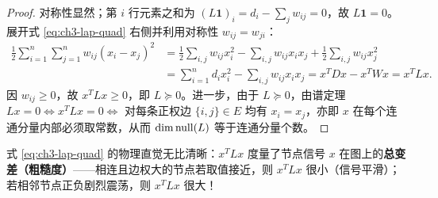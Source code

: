 \begin{proof}
对称性显然；第 $i$ 行元素之和为 $(L\mathbf{1})_i = d_i - \sum_j w_{ij} = 0$，故 $L\mathbf{1}=0$。展开式 \eqref{eq:ch3-lap-quad} 右侧并利用对称性 $w_{ij} = w_{ji}$：
\begin{align*}
  \frac{1}{2}\sum_{i=1}^n \sum_{j=1}^n w_{ij}(x_i - x_j)^2
  &= \frac{1}{2}\sum_{i,j} w_{ij} x_i^2 - \sum_{i,j} w_{ij} x_i x_j + \frac{1}{2}\sum_{i,j} w_{ij} x_j^2 \\
  &= \sum_{i=1}^n d_i x_i^2 - \sum_{i,j} w_{ij} x_i x_j
   = x^T D x - x^T W x = x^T L x.
\end{align*}
因 $w_{ij} \ge 0$，故 $x^T L x \ge 0$，即 $L \succeq 0$。进一步，由于 $L \succeq 0$，由谱定理 $Lx = 0 \iff x^T L x = 0 \iff$ 对每条正权边 $\{i,j\}\in E$ 均有 $x_i = x_j$，亦即 $x$ 在每个连通分量内部必须取常数，从而 $\dim\operatorname{null}(L)$ 等于连通分量个数。
\end{proof}

式 \eqref{eq:ch3-lap-quad} 的物理直觉无比清晰：$x^T L x$ 度量了节点信号 $x$ 在图上的\textbf{总变差（粗糙度）}——相连且边权大的节点若取值接近，则 $x^T L x$ 很小（信号平滑）；若相邻节点正负剧烈震荡，则 $x^T L x$ 很大！

